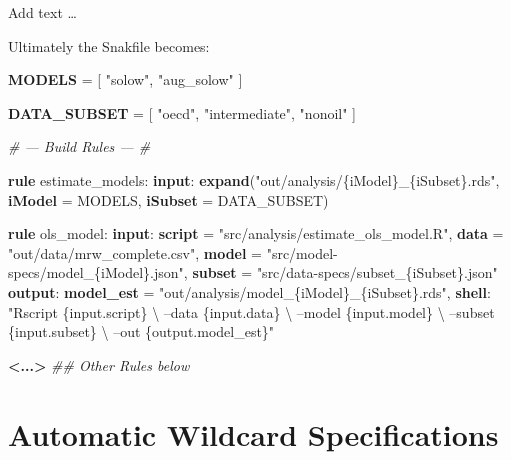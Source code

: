 \documentclass[]{book}
\newenvironment{Shaded}{\begin{snugshade}}{\end{snugshade}}
\newcommand{\KeywordTok}[1]{\textcolor[rgb]{0.13,0.29,0.53}{\textbf{{#1}}}}
\newcommand{\StringTok}[1]{\textcolor[rgb]{0.31,0.60,0.02}{{#1}}}
\newcommand{\CommentTok}[1]{\textcolor[rgb]{0.56,0.35,0.01}{\textit{{#1}}}}
\newcommand{\NormalTok}[1]{{#1}}
\theoremstyle{definition}
\theoremstyle{definition}
\theoremstyle{definition}
\theoremstyle{remark}
\begin{document}
Add text \ldots{}

Ultimately the Snakfile becomes:

\begin{Shaded}
\begin{Highlighting}[]
\KeywordTok{MODELS} \NormalTok{= [}
          \StringTok{"solow"}\NormalTok{,}
          \StringTok{"aug_solow"}
          \NormalTok{]}

\KeywordTok{DATA_SUBSET} \NormalTok{= [}
                \StringTok{"oecd"}\NormalTok{,}
                \StringTok{"intermediate"}\NormalTok{,}
                \StringTok{"nonoil"}
                \NormalTok{]}

\CommentTok{# --- Build Rules --- #}

\KeywordTok{rule} \NormalTok{estimate_models:}
    \KeywordTok{input}\NormalTok{:}
        \KeywordTok{expand}\NormalTok{(}\StringTok{"out/analysis/\{iModel\}_\{iSubset\}.rds"}\NormalTok{,}
                    \KeywordTok{iModel} \NormalTok{= MODELS,}
                    \KeywordTok{iSubset} \NormalTok{= DATA_SUBSET)}

\KeywordTok{rule} \NormalTok{ols_model:}
    \KeywordTok{input}\NormalTok{:}
        \KeywordTok{script} \NormalTok{= }\StringTok{"src/analysis/estimate_ols_model.R"}\NormalTok{,}
        \KeywordTok{data}   \NormalTok{= }\StringTok{"out/data/mrw_complete.csv"}\NormalTok{,}
        \KeywordTok{model}  \NormalTok{= }\StringTok{"src/model-specs/model_\{iModel\}.json"}\NormalTok{,}
        \KeywordTok{subset} \NormalTok{= }\StringTok{"src/data-specs/subset_\{iSubset\}.json"}
    \KeywordTok{output}\NormalTok{:}
        \KeywordTok{model_est} \NormalTok{= }\StringTok{"out/analysis/model_\{iModel\}_\{iSubset\}.rds"}\NormalTok{,}
    \KeywordTok{shell}\NormalTok{:}
        \StringTok{"Rscript \{input.script\} \textbackslash{}}
\StringTok{            --data \{input.data\} \textbackslash{}}
\StringTok{            --model \{input.model\} \textbackslash{}}
\StringTok{            --subset \{input.subset\} \textbackslash{}}
\StringTok{            --out \{output.model_est\}"}

\KeywordTok{<...>} \CommentTok{## Other Rules below}
\end{Highlighting}
\end{Shaded}

\chapter{Automatic Wildcard
Specifications}\label{automatic-wildcard-specifications}
\end{document}
